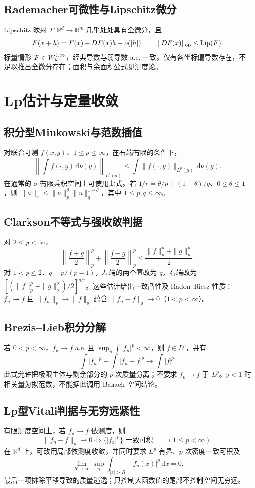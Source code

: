 \documentclass[../main.tex]{subfiles}
\begin{document}
\subsection{Rademacher可微性与Lipschitz微分}
Lipschitz 映射 $F:\mathbb R^d\to\mathbb R^m$ 几乎处处具有全微分，且
\[
F(x+h)=F(x)+DF(x)h+o(|h|),\qquad\|DF(x)\|_{\rm op}\le\operatorname{Lip}(F).
\]
标量情形 $F\in W^{1,\infty}_{\rm loc}$，经典导数与弱导数 a.e. 一致。仅有各坐标偏导数存在，不足以推出全微分存在；面积与余面积公式见\hyperref[chap:measure-theory]{测度论}。
\section{Lp估计与定量收敛}
\subsection{积分型Minkowski与范数插值}
对联合可测 $f(x,y)$、$1\le p\le\infty$，在右端有限的条件下，
\[
\left\|\int f(\cdot,y)\,\mathrm d\nu(y)\right\|_{L^p(\mu)}
\le\int\|f(\cdot,y)\|_{L^p(\mu)}\,\mathrm d\nu(y).
\]
在通常的 $\sigma$-有限乘积空间上可使用此式。若 $1/r=\theta/p+(1-\theta)/q$、$0\le\theta\le1$，则 $\|u\|_r\le\|u\|_p^\theta\|u\|_q^{1-\theta}$，其中 $1\le p,q\le\infty$。
\subsection{Clarkson不等式与强收敛判据}
对 $2\le p<\infty$，
\[
\left\|\frac{f+g}2\right\|_p^p+\left\|\frac{f-g}2\right\|_p^p
\le\frac{\|f\|_p^p+\|g\|_p^p}2.
\]
对 $1<p\le2$、$q=p/(p-1)$，左端的两个幂改为 $q$，右端改为 $[(\|f\|_p^p+\|g\|_p^p)/2]^{q/p}$。这些估计给出一致凸性及 Radon--Riesz 性质：$f_n\rightharpoonup f$ 且 $\|f_n\|_p\to\|f\|_p$ 蕴含 $\|f_n-f\|_p\to0$（$1<p<\infty$）。
\subsection{Brezis--Lieb积分分解}
若 $0<p<\infty$，$f_n\to f$ a.e. 且 $\sup_n\int|f_n|^p<\infty$，则 $f\in L^p$，并有
\[
\int|f_n|^p-\int|f_n-f|^p\longrightarrow\int|f|^p.
\]
此式允许把极限主体与剩余部分的 $p$ 次质量分离；不要求 $f_n\to f$ 于 $L^p$。$p<1$ 时相关量为拟范数，不能据此调用 Banach 空间结论。
\subsection{Lp型Vitali判据与无穷远紧性}
有限测度空间上，若 $f_n\to f$ 依测度，则
\[
\|f_n-f\|_p\to0\iff\{|f_n|^p\}\text{ 一致可积}\qquad(1\le p<\infty).
\]
在 $\mathbb R^d$ 上，可改用局部依测度收敛，并同时要求 $L^p$ 有界、$p$ 次密度一致可积及
\[
\lim_{R\to\infty}\sup_n\int_{|x|>R}|f_n(x)|^p\,\mathrm dx=0.
\]
最后一项排除平移导致的质量逃逸；只控制大函数值的尾部不控制空间无穷远。
\end{document}
